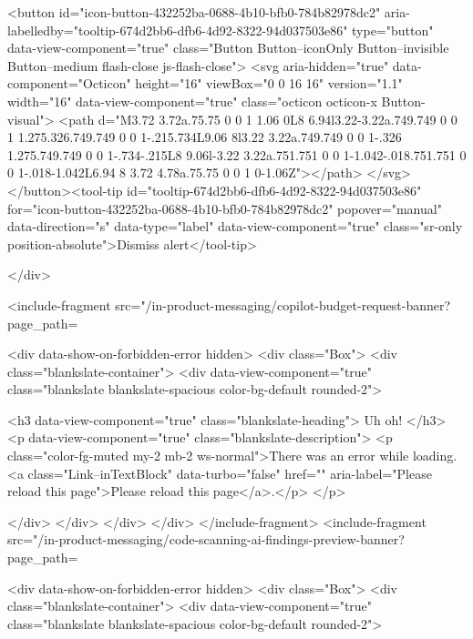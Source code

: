 {{{    <button id="icon-button-432252ba-0688-4b10-bfb0-784b82978dc2" aria-labelledby="tooltip-674d2bb6-dfb6-4d92-8322-94d037503e86" type="button" data-view-component="true" class="Button Button--iconOnly Button--invisible Button--medium flash-close js-flash-close">  <svg aria-hidden="true" data-component="Octicon" height="16" viewBox="0 0 16 16" version="1.1" width="16" data-view-component="true" class="octicon octicon-x Button-visual">
    <path d="M3.72 3.72a.75.75 0 0 1 1.06 0L8 6.94l3.22-3.22a.749.749 0 0 1 1.275.326.749.749 0 0 1-.215.734L9.06 8l3.22 3.22a.749.749 0 0 1-.326 1.275.749.749 0 0 1-.734-.215L8 9.06l-3.22 3.22a.751.751 0 0 1-1.042-.018.751.751 0 0 1-.018-1.042L6.94 8 3.72 4.78a.75.75 0 0 1 0-1.06Z"></path>
</svg>
</button><tool-tip id="tooltip-674d2bb6-dfb6-4d92-8322-94d037503e86" for="icon-button-432252ba-0688-4b10-bfb0-784b82978dc2" popover="manual" data-direction="s" data-type="label" data-view-component="true" class="sr-only position-absolute">Dismiss alert</tool-tip>


  
</div>
        
        <include-fragment src="/in-product-messaging/copilot-budget-request-banner?page_path=%
  
  <div data-show-on-forbidden-error hidden>
    <div class="Box">
  <div class="blankslate-container">
    <div data-view-component="true" class="blankslate blankslate-spacious color-bg-default rounded-2">
      

      <h3 data-view-component="true" class="blankslate-heading">        Uh oh!
</h3>
      <p data-view-component="true" class="blankslate-description">        <p class="color-fg-muted my-2 mb-2 ws-normal">There was an error while loading. <a class="Link--inTextBlock" data-turbo="false" href="" aria-label="Please reload this page">Please reload this page</a>.</p>
</p>

</div>  </div>
</div>  </div>
</include-fragment>
        <include-fragment src="/in-product-messaging/code-scanning-ai-findings-preview-banner?page_path=%
  
  <div data-show-on-forbidden-error hidden>
    <div class="Box">
  <div class="blankslate-container">
    <div data-view-component="true" class="blankslate blankslate-spacious color-bg-default rounded-2">
      

}}}
